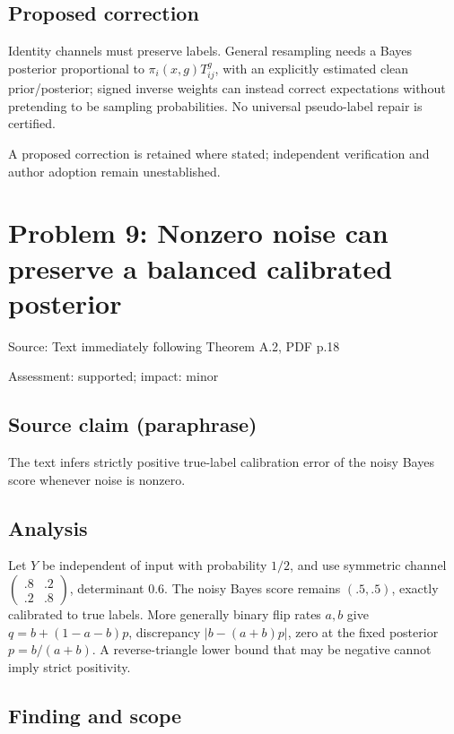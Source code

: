 \documentclass[11pt]{article}
\begin{document}
\subsection*{Proposed correction}

Identity channels must preserve labels. General resampling needs a Bayes posterior proportional to \(\pi_i(x,g)T^g_{ij}\), with an explicitly estimated clean prior/posterior; signed inverse weights can instead correct expectations without pretending to be sampling probabilities. No universal pseudo-label repair is certified.

A proposed correction is retained where stated; independent verification and author adoption remain unestablished.

\section*{Problem 9: Nonzero noise can preserve a balanced calibrated posterior}

Source: Text immediately following Theorem A.2, PDF p.18

Assessment: supported; impact: minor

\subsection*{Source claim (paraphrase)}

The text infers strictly positive true-label calibration error of the noisy Bayes score whenever noise is nonzero.

\subsection*{Analysis}

Let \(Y\) be independent of input with probability \(1/2\), and use symmetric channel \(\begin{pmatrix}.8&.2\\.2&.8\end{pmatrix}\), determinant \(0.6\). The noisy Bayes score remains \((.5,.5)\), exactly calibrated to true labels. More generally binary flip rates \(a,b\) give \(q=b+(1-a-b)p\), discrepancy \(|b-(a+b)p|\), zero at the fixed posterior \(p=b/(a+b)\). A reverse-triangle lower bound that may be negative cannot imply strict positivity.

\subsection*{Finding and scope}
\end{document}
